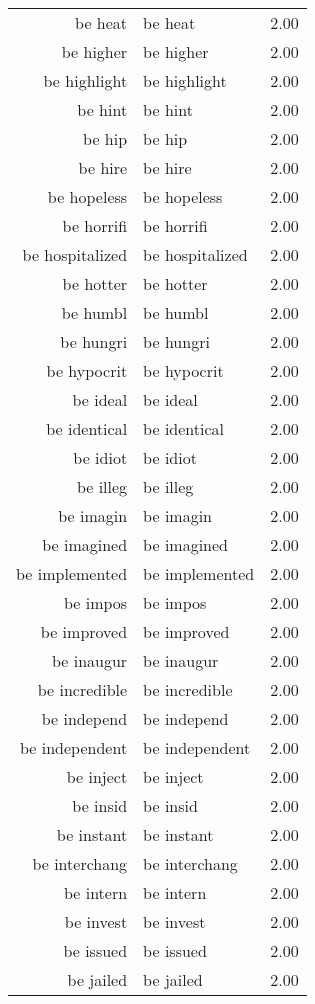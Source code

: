 \begin{table}[ht]
\begin{tabular}{rlr}
  be heat & be heat & 2.00 \\ 
  be higher & be higher & 2.00 \\ 
  be highlight & be highlight & 2.00 \\ 
  be hint & be hint & 2.00 \\ 
  be hip & be hip & 2.00 \\ 
  be hire & be hire & 2.00 \\ 
  be hopeless & be hopeless & 2.00 \\ 
  be horrifi & be horrifi & 2.00 \\ 
  be hospitalized & be hospitalized & 2.00 \\ 
  be hotter & be hotter & 2.00 \\ 
  be humbl & be humbl & 2.00 \\ 
  be hungri & be hungri & 2.00 \\ 
  be hypocrit & be hypocrit & 2.00 \\ 
  be ideal & be ideal & 2.00 \\ 
  be identical & be identical & 2.00 \\ 
  be idiot & be idiot & 2.00 \\ 
  be illeg & be illeg & 2.00 \\ 
  be imagin & be imagin & 2.00 \\ 
  be imagined & be imagined & 2.00 \\ 
  be implemented & be implemented & 2.00 \\ 
  be impos & be impos & 2.00 \\ 
  be improved & be improved & 2.00 \\ 
  be inaugur & be inaugur & 2.00 \\ 
  be incredible & be incredible & 2.00 \\ 
  be independ & be independ & 2.00 \\ 
  be independent & be independent & 2.00 \\ 
  be inject & be inject & 2.00 \\ 
  be insid & be insid & 2.00 \\ 
  be instant & be instant & 2.00 \\ 
  be interchang & be interchang & 2.00 \\ 
  be intern & be intern & 2.00 \\ 
  be invest & be invest & 2.00 \\ 
  be issued & be issued & 2.00 \\ 
  be jailed & be jailed & 2.00 \\ 

\end{tabular}
\end{table}
